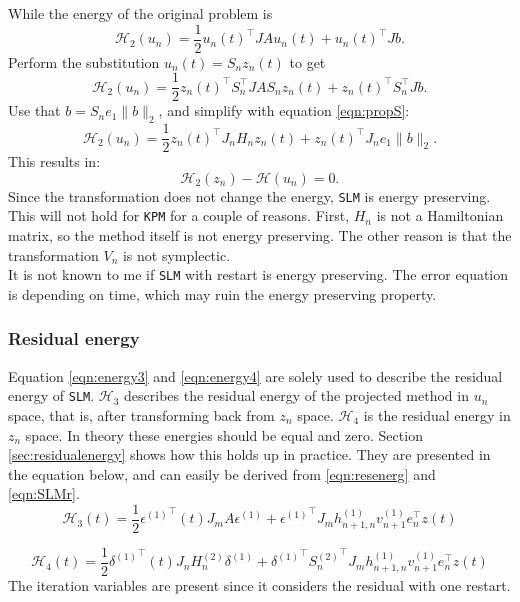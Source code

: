 \noindent While the energy of the original problem is 
\begin{equation*}
\mathcal{H}_2(u_n) = \frac{1}{2}u_n(t)^\top J A u_n(t) + u_n(t)^\top J b.
\end{equation*}
Perform the substitution $ u_n(t) = S_n z_n(t) $ to get
\begin{equation*}
\mathcal{H}_2(u_n) = \frac{1}{2}z_n(t)^\top S_n^\top J A S_n z_n(t) + z_n(t)^\top S_n^\top J b.
\end{equation*}
Use that $ b = S_n e_1 \| b \|_2 $, and simplify with equation \eqref{eqn:propS}:
\begin{equation*}
\mathcal{H}_2(u_n) = \frac{1}{2}z_n(t)^\top J_n H_n z_n(t) + z_n(t)^\top J_n e_1 \|b \|_2.
\end{equation*}
This results in: 
\begin{equation*}
\mathcal{H}_2(z_n) - \mathcal{H}(u_n) = 0.
\end{equation*}
Since the transformation does not change the energy, \texttt{SLM} is energy preserving. This will not hold for \texttt{KPM} for a couple of reasons. First, $H_n$ is not a Hamiltonian matrix, so the method itself is not energy preserving. The other reason is that the transformation $V_n$ is not symplectic.\\ 
It is not known to me if \texttt{SLM} with restart is energy preserving. The error equation is depending on time, which may ruin the energy preserving property. 
\subsubsection{Residual energy}
Equation \eqref{eqn:energy3} and \eqref{eqn:energy4} are solely used to describe the residual energy of \texttt{SLM}. $\mathcal{H}_3$ describes the residual energy of the projected method in $u_n$ space, that is, after transforming back from $z_n$ space. $\mathcal{H}_4$ is the residual energy in $z_n$ space. In theory these energies should be equal and zero. Section \ref{sec:residualenergy} shows how this holds up in practice. 
They are presented in the equation below, and can easily be derived from \eqref{eqn:resenerg} and \eqref{eqn:SLMr}. \\
\begin{equation}
\mathcal{H}_3 (t) = \frac{1}{2} {\epsilon^{(1)}}^\top (t) J_m A \epsilon^{(1)} + {\epsilon^{(1)}}^\top J_m h_{n+1,n}^{(1)} v_{n+1}^{(1)} e_n^\top z(t)
\label{eqn:energy3}
\end{equation}

\begin{equation}
\mathcal{H}_4 (t) = \frac{1}{2} {\delta^{(1)}}^\top (t) J_n H_n^{(2)} \delta^{(1)} + {\delta^{(1)}}^\top {S_n^{(2)}}^\top  J_m h_{n+1,n}^{(1)} v_{n+1}^{(1)} e_n^\top z(t)
\label{eqn:energy4}
\end{equation}
The iteration variables are present since it considers the residual with one restart.

